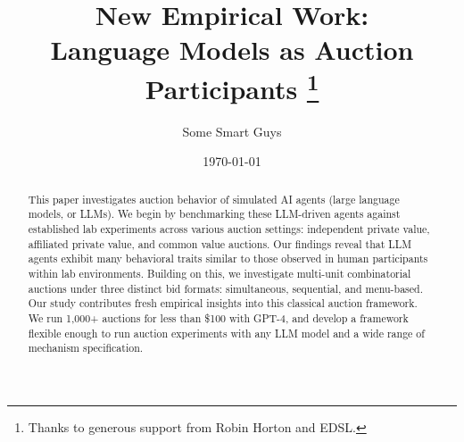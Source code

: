 \documentclass{article} %
\title{\vspace*{-1cm} New Empirical Work: \\ Language Models as Auction Participants \thanks{
  \footnotesize
  Thanks to generous support from Robin Horton and EDSL.
}
}
\author{Some Smart Guys}
\date{\today}
\begin{document}
\maketitle

\begin{abstract}
\noindent This paper investigates auction behavior of simulated AI agents (large language models, or LLMs). 
We begin by benchmarking these LLM-driven agents against established lab experiments across various auction settings: independent private value, affiliated private value, and common value auctions. 
Our findings reveal that LLM agents exhibit many behavioral traits similar to those observed in human participants within lab environments.
Building on this, we investigate multi-unit combinatorial auctions under three distinct bid formats: simultaneous, sequential, and menu-based. 
Our study contributes fresh empirical insights into this classical auction framework.
We run 1,000+ auctions for less than \$100 with GPT-4, and develop a framework flexible enough to run auction experiments with any LLM model and a wide range of mechanism  specification. 

\end{abstract}
\newpage
\end{document}
